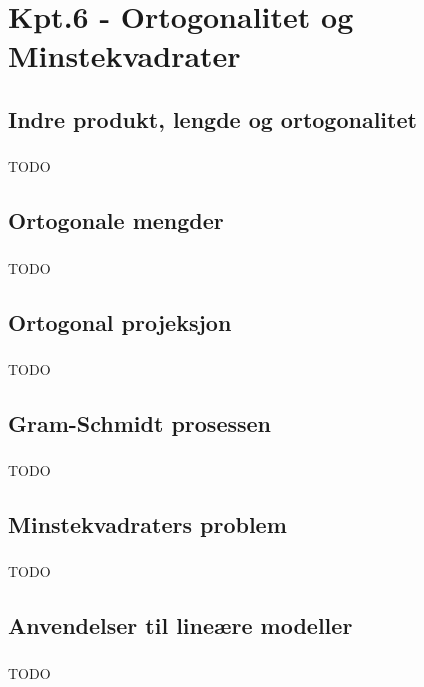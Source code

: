 \documentclass{article}
\begin{document}
  \section{Kpt.6 - Ortogonalitet og Minstekvadrater}
    \subsection{Indre produkt, lengde og ortogonalitet}
      \subsubsection{}
        TODO
    \subsection{Ortogonale mengder}
      \subsubsection{}
        TODO
    \subsection{Ortogonal projeksjon}
      \subsubsection{}
        TODO
    \subsection{Gram-Schmidt prosessen}
      \subsubsection{}
        TODO
    \subsection{Minstekvadraters problem}
      \subsubsection{}
        TODO
    \subsection{Anvendelser til lineære modeller}
      \subsubsection{}
        TODO
\end{document}
